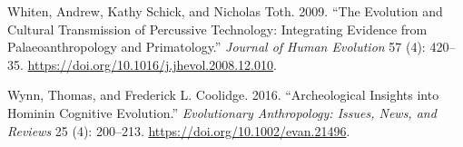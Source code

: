 \documentclass[]{elsarticle} %
\begin{document}
\leavevmode\hypertarget{ref-whitenEvolutionCulturalTransmission2009a}{}%
Whiten, Andrew, Kathy Schick, and Nicholas Toth. 2009. ``The Evolution
and Cultural Transmission of Percussive Technology: Integrating Evidence
from Palaeoanthropology and Primatology.'' \emph{Journal of Human
Evolution} 57 (4): 420--35.
\url{https://doi.org/10.1016/j.jhevol.2008.12.010}.

\leavevmode\hypertarget{ref-wynnArcheologicalInsightsHominin2016}{}%
Wynn, Thomas, and Frederick L. Coolidge. 2016. ``Archeological Insights
into Hominin Cognitive Evolution.'' \emph{Evolutionary Anthropology:
Issues, News, and Reviews} 25 (4): 200--213.
\url{https://doi.org/10.1002/evan.21496}.
\end{document}
